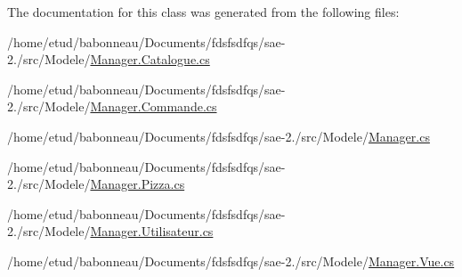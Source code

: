 The documentation for this class was generated from the following files\+:\begin{DoxyCompactItemize}
\item 
/home/etud/babonneau/\+Documents/fdsfsdfqs/sae-\/2./src/\+Modele/\hyperlink{Manager_8Catalogue_8cs}{Manager.\+Catalogue.\+cs}\item 
/home/etud/babonneau/\+Documents/fdsfsdfqs/sae-\/2./src/\+Modele/\hyperlink{Manager_8Commande_8cs}{Manager.\+Commande.\+cs}\item 
/home/etud/babonneau/\+Documents/fdsfsdfqs/sae-\/2./src/\+Modele/\hyperlink{Manager_8cs}{Manager.\+cs}\item 
/home/etud/babonneau/\+Documents/fdsfsdfqs/sae-\/2./src/\+Modele/\hyperlink{Manager_8Pizza_8cs}{Manager.\+Pizza.\+cs}\item 
/home/etud/babonneau/\+Documents/fdsfsdfqs/sae-\/2./src/\+Modele/\hyperlink{Manager_8Utilisateur_8cs}{Manager.\+Utilisateur.\+cs}\item 
/home/etud/babonneau/\+Documents/fdsfsdfqs/sae-\/2./src/\+Modele/\hyperlink{Manager_8Vue_8cs}{Manager.\+Vue.\+cs}\end{DoxyCompactItemize}
